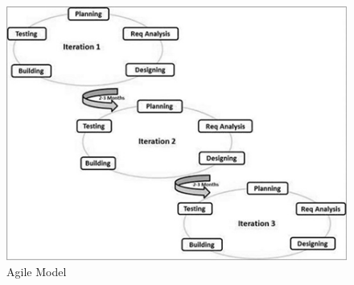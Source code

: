 \begin{figure}[ht]
\centering
\includegraphics[scale=0.5]{images/Agile.png}
\caption{Agile Model}
\end{figure}


